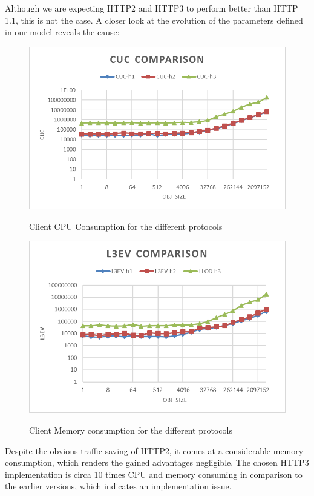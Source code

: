 \documentclass[runningheads]{llncs}
\begin{document}
Although we are expecting HTTP2 and HTTP3 to perform better than HTTP 1.1, this is not the case. A closer look at the evolution of the parameters defined in our model reveals the cause:
\begin{figure}
    \centering
    \begin{minipage}{0.49\textwidth}
        \centering\vspace{-2em}
        \includegraphics[width=1\textwidth]{cuc-h2load-mistral.png}\vspace{-1em}
        \caption{Client CPU Consumption for the different protocols}\vspace{-1.5em}
		\label {fig:cuc-comp}
    \end{minipage}\hfill
    \begin{minipage}{0.49\textwidth}
        \centering\vspace{-2em}
        \includegraphics[width=1\textwidth]{l3ev-h2load-mistral.png}\vspace{-1em}
        \caption{Client Memory consumption for the different protocols}\vspace{-1.5em}
		\label {fig:llod-comp}
    \end{minipage}
\end{figure}
Despite the obvious traffic saving of HTTP2, it comes at a considerable memory consumption, which renders the gained advantages negligible. The chosen HTTP3 implementation is circa 10 times CPU and memory consuming in comparison to the earlier versions, which indicates an implementation issue.
\end{document}

